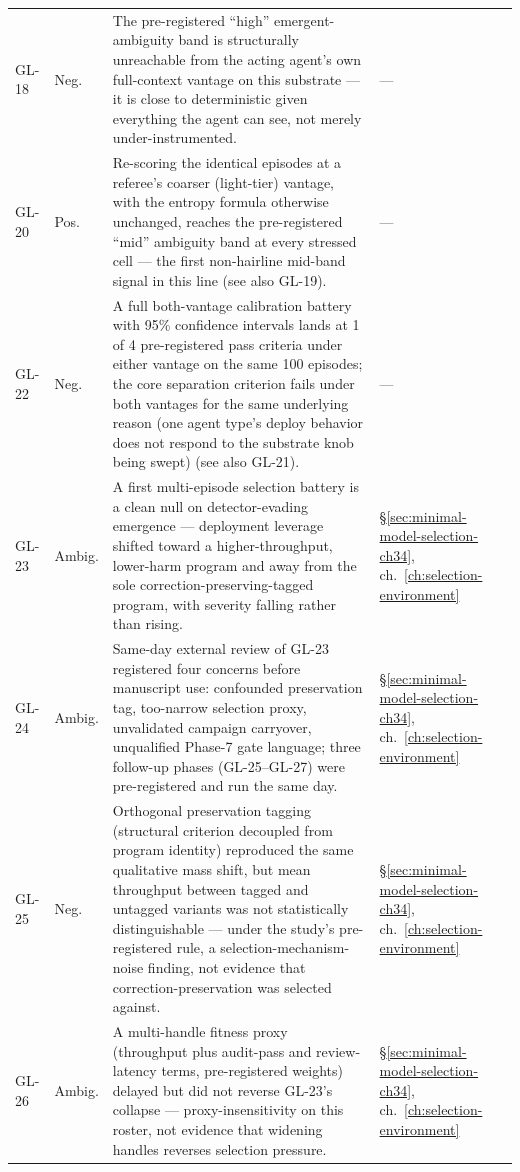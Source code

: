 \begin{longtable}{@{}L{0.05\textwidth}L{0.08\textwidth}L{0.55\textwidth}L{0.255\textwidth}@{}}
\label{finding:gl-18}GL-18 & Neg. & The pre-registered ``high'' emergent-ambiguity band is structurally unreachable from the acting agent's own full-context vantage on this substrate --- it is close to deterministic given everything the agent can see, not merely under-instrumented. & --- \\
\label{finding:gl-20}GL-20 & Pos. & Re-scoring the identical episodes at a referee's coarser (light-tier) vantage, with the entropy formula otherwise unchanged, reaches the pre-registered ``mid'' ambiguity band at every stressed cell --- the first non-hairline mid-band signal in this line (see also GL-19). & --- \\
\label{finding:gl-22}GL-22 & Neg. & A full both-vantage calibration battery with 95\% confidence intervals lands at 1 of 4 pre-registered pass criteria under either vantage on the same 100 episodes; the core separation criterion fails under both vantages for the same underlying reason (one agent type's deploy behavior does not respond to the substrate knob being swept) (see also GL-21). & --- \\
\label{finding:gl-23}GL-23 & Ambig. & A first multi-episode selection battery is a clean null on detector-evading emergence --- deployment leverage shifted toward a higher-throughput, lower-harm program and away from the sole correction-preserving-tagged program, with severity falling rather than rising. & \S\ref{sec:minimal-model-selection-ch34}, ch.~\ref{ch:selection-environment} \\
\label{finding:gl-24}GL-24 & Ambig. & Same-day external review of GL-23 registered four concerns before manuscript use: confounded preservation tag, too-narrow selection proxy, unvalidated campaign carryover, unqualified Phase-7 gate language; three follow-up phases (GL-25--GL-27) were pre-registered and run the same day. & \S\ref{sec:minimal-model-selection-ch34}, ch.~\ref{ch:selection-environment} \\
\label{finding:gl-25}GL-25 & Neg. & Orthogonal preservation tagging (structural criterion decoupled from program identity) reproduced the same qualitative mass shift, but mean throughput between tagged and untagged variants was not statistically distinguishable --- under the study's pre-registered rule, a selection-mechanism-noise finding, not evidence that correction-preservation was selected against. & \S\ref{sec:minimal-model-selection-ch34}, ch.~\ref{ch:selection-environment} \\
\label{finding:gl-26}GL-26 & Ambig. & A multi-handle fitness proxy (throughput plus audit-pass and review-latency terms, pre-registered weights) delayed but did not reverse GL-23's collapse --- proxy-insensitivity on this roster, not evidence that widening handles reverses selection pressure. & \S\ref{sec:minimal-model-selection-ch34}, ch.~\ref{ch:selection-environment} \\

\end{longtable}
